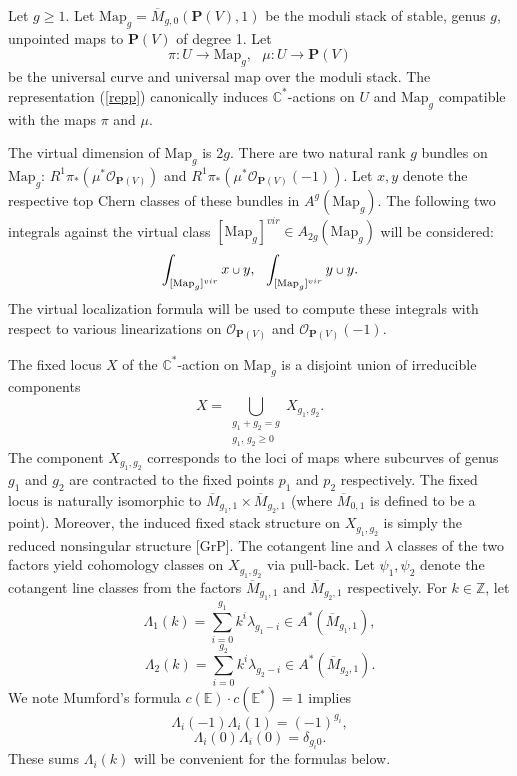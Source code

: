 \documentclass[11 pt]{amsart}
\newcommand{\proj}{\mathbf P}
\newcommand{\rarr}{\rightarrow}
\newcommand{\oh}{{\mathcal{O}}}
\newcommand{\com}{\mathbb{C}}
\newcommand{\Z}{\mathbb{Z}}
\newcommand{\HH}{\Lambda}
\newcommand{\mgp}{\text{Map}_g}
\def\scup{\mathbin{\text{\scriptsize$\cup$}}}
\newcommand{\hodge}{\mathbb{E}}
\begin{document}
Let $g\geq 1$.
Let $\mgp= \overline{M}_{g,0}(\proj(V),1)$ be the
moduli stack of stable, genus $g$, unpointed maps
to $\proj(V)$ of degree 1. Let 
\begin{equation}
\label{zzzz}
\pi: U \rarr \mgp , \ \ \ \mu: U \rarr \proj(V)
\end{equation}
be the universal curve and universal map over the
moduli stack. The representation (\ref{repp}) canonically
induces $\com^*$-actions on $U$ and $\mgp$ compatible
with the maps $\pi$ and $\mu$.


The virtual dimension of $\mgp$ is $2g$. 
There are two natural rank $g$ bundles on $\mgp$:
$R^1\pi_*(\mu^*{\oh_{\proj(V)}})$ and 
$R^1\pi_* (\mu^* \oh_{\proj(V)}(-1))$.
Let $x, y$ denote the respective top Chern
classes of these bundles in $A^g(\mgp)$.
The
following two integrals against the virtual
class $[\mgp]^{vir} \in A_{2g}(\mgp)$ will be considered:
\begin{equation}
\label{rrrr}
\int_{[\mgp]^{vir}} x \scup y,
\ \
\int_{[\mgp]^{vir}} y \scup y.
\end{equation}
The virtual localization formula will be used to
compute these integrals with respect to various
linearizations on $\oh_{\proj(V)}$ and $\oh_{\proj(V)}(-1)$.


The fixed locus $X$ of the $\com^*$-action on
$\mgp$ is a disjoint union of irreducible
components 
$$X=\bigcup_{\substack{g_1+g_2=g\\g_1,\,g_2 \geq 0}} X_{g_1,g_2}.$$
The component $X_{g_1,g_2}$ corresponds to
the loci of maps where subcurves of genus $g_1$ and
$g_2$ are contracted to the fixed points $p_1$ and
$p_2$ respectively. The fixed locus is naturally isomorphic
to $\overline{M}_{g_1,1} \times \overline{M}_{g_2,1}$ (where
$\overline{M}_{0,1}$ is defined to be a point).
Moreover, the induced fixed stack structure   
on $X_{g_1, g_2}$ is simply the reduced nonsingular structure [GrP].
The cotangent line and $\lambda$ classes of the
two factors yield cohomology classes on $X_{g_1, g_2}$
via pull-back. Let $\psi_1, \psi_2$ denote the 
cotangent line classes from the factors
$\overline{M}_{g_1,1}$ and $\overline{M}_{g_2,1}$ respectively.
For $k\in \Z$, let
$$\HH_1(k)= \sum_{i=0}^{g_1} k^i \lambda_{g_1-i} \in 
A^*(\overline{M}_{g_1,1}),$$
$$\HH_2(k)= \sum_{i=0}^{g_2} k^i \lambda_{g_2-i} \in 
A^*(\overline{M}_{g_2,1}).$$
We note Mumford's formula $c(\hodge)\cdot c(\hodge^*)=1$ 
implies
\begin{equation}
\label{mmumm}
\HH_i(-1) \HH_i(1) = (-1)^{g_i},
\end{equation}
$$ \HH_i(0) \HH_i(0) = \delta_{g_i 0}.$$
These sums $\HH_i(k)$ will be convenient for the formulas below.
\end{document}
